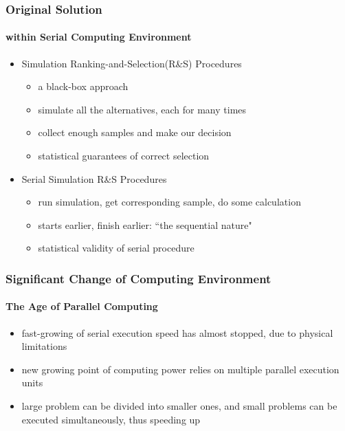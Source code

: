 \documentclass{beamer}
\begin{document}
\begin{frame}
\frametitle{Original Solution}
\framesubtitle{within Serial Computing Environment}
\begin{itemize}
\item Simulation Ranking-and-Selection(R\&S) Procedures
\begin{itemize}
\item a black-box approach
\item simulate all the alternatives, each for many times
\item collect enough samples and make our decision
\item statistical guarantees of correct selection
\end{itemize}
\vspace{\baselineskip}
\item Serial Simulation R\&S Procedures
\begin{itemize}
\item run simulation, get corresponding sample, do some calculation
\item starts earlier, finish earlier: ``the sequential nature"
\item statistical validity of serial procedure
\end{itemize}
\end{itemize}
\end{frame}

\begin{frame}
\frametitle {Significant Change of Computing Environment}
\framesubtitle{The Age of Parallel Computing}
\begin{itemize}
\item fast-growing of serial execution speed has almost stopped, due to physical limitations
\vspace{\baselineskip}
\item new growing point of computing power relies on multiple parallel execution units
\vspace{\baselineskip}
\item large problem can be divided into smaller ones, and small problems can be executed simultaneously, thus speeding up
\end{itemize}
\end{frame}
\end{document}
